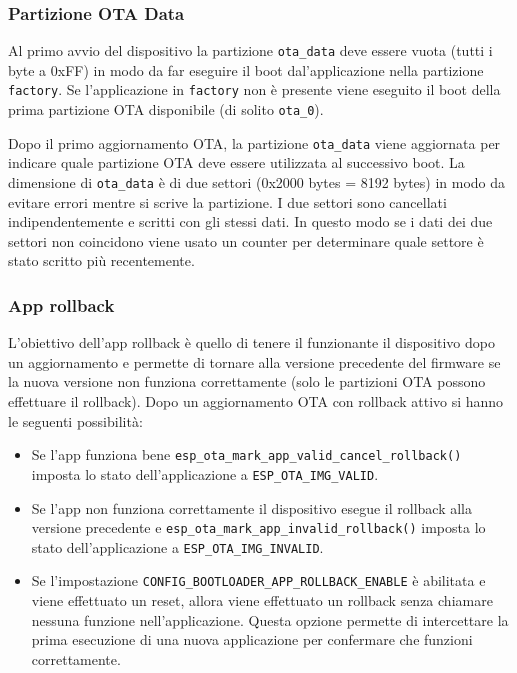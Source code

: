 \documentclass[a4paper]{article}
\begin{document}
\subsubsection{Partizione OTA Data}
Al primo avvio del dispositivo la partizione \texttt{ota\_data} deve essere vuota (tutti i
byte a 0xFF) in modo da far eseguire il boot dal'applicazione nella partizione
\texttt{factory}. Se l'applicazione in \texttt{factory} non è presente viene eseguito il boot
della prima partizione OTA disponibile (di solito \texttt{ota\_0}).

Dopo il primo aggiornamento OTA, la partizione \texttt{ota\_data} viene aggiornata per
indicare quale partizione OTA deve essere utilizzata al successivo boot. La dimensione
di \texttt{ota\_data} è di due settori (0x2000 bytes = 8192 bytes) in modo da evitare
errori mentre si scrive la partizione. I due settori sono cancellati indipendentemente
e scritti con gli stessi dati. In questo modo se i dati dei due settori non coincidono
viene usato un counter per determinare quale settore è stato scritto più recentemente.

\subsubsection{App rollback}
L'obiettivo dell'app rollback è quello di tenere il funzionante il dispositivo dopo un
aggiornamento e permette di tornare alla versione precedente del firmware se la nuova
versione non funziona correttamente (solo le partizioni OTA possono effettuare il rollback).
Dopo un aggiornamento OTA con rollback attivo si hanno le seguenti possibilità:
\begin{itemize}
  \item Se l'app funziona bene \texttt{esp\_ota\_mark\_app\_valid\_cancel\_rollback()}
    imposta lo stato dell'applicazione a \texttt{ESP\_OTA\_IMG\_VALID}.

  \item Se l'app non funziona correttamente il dispositivo esegue il rollback alla versione
    precedente e \texttt{esp\_ota\_mark\_app\_invalid\_rollback()} imposta lo stato
    dell'applicazione a \texttt{ESP\_OTA\_IMG\_INVALID}.

  \item Se l'impostazione \texttt{CONFIG\_BOOTLOADER\_APP\_ROLLBACK\_ENABLE} è abilitata
    e viene effettuato un reset, allora viene effettuato un rollback senza chiamare
    nessuna funzione nell'applicazione. Questa opzione permette di intercettare la
    prima esecuzione di una nuova applicazione per confermare che funzioni correttamente.
\end{itemize}
\end{document}
